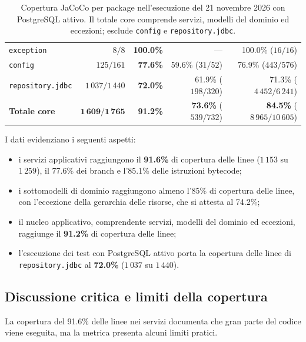\begin{table}[htbp]
\begin{tabular*}{\textwidth}{@{\extracolsep{\fill}}lrrrr@{}}
\texttt{exception}
& $8 / 8$
& \textbf{100.0\%}
& ---
& 100.0\% ($16 / 16$) \\

\texttt{config}
& $125 / 161$
& \textbf{77.6\%}
& 59.6\% ($31 / 52$)
& 76.9\% ($443 / 576$) \\

\texttt{repository.jdbc}
& $1\,037 / 1\,440$
& \textbf{72.0\%}
& 61.9\% ($198 / 320$)
& 71.3\% ($4\,452 / 6\,241$) \\

\midrule
\textbf{Totale core}
& $\mathbf{1\,609 / 1\,765}$
& \textbf{91.2\%}
& \textbf{73.6\%} ($539 / 732$)
& \textbf{84.5\%} ($8\,965 / 10\,605$) \\

\bottomrule
\end{tabular*}
\caption{Copertura JaCoCo per package nell'esecuzione
del 21 novembre 2026 con PostgreSQL attivo.
Il totale core comprende servizi, modelli del dominio
ed eccezioni; esclude \texttt{config} e \texttt{repository.jdbc}.}
\label{tab:jacoco-coverage}
\end{table}

I dati evidenziano i seguenti aspetti:
\begin{itemize}
    \item i servizi applicativi raggiungono il
    \textbf{91.6\%} di copertura delle linee
    ($1\,153$ su $1\,259$), il 77.6\% dei branch
    e l'85.1\% delle istruzioni bytecode;

    \item i sottomodelli di dominio raggiungono almeno
    l'85\% di copertura delle linee, con l'eccezione
    della gerarchia delle risorse, che si attesta al 74.2\%;

    \item il nucleo applicativo, comprendente servizi,
    modelli del dominio ed eccezioni, raggiunge il
    \textbf{91.2\%} di copertura delle linee;

    \item l'esecuzione dei test con PostgreSQL attivo
    porta la copertura delle linee di
    \texttt{repository.jdbc} al \textbf{72.0\%}
    ($1\,037$ su $1\,440$).
\end{itemize}

\subsection{Discussione critica e limiti della copertura}
\label{sec:limiti-copertura}
La copertura del 91.6\% delle linee nei servizi documenta che gran parte del codice viene eseguita, ma la metrica presenta alcuni limiti pratici.

